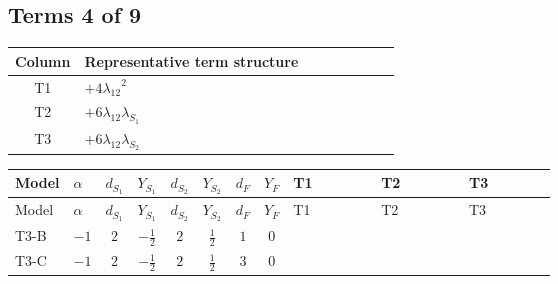 \documentclass[8pt]{article}
\begin{document}
\begin{landscape}
\subsection*{Terms 4 of 9}
\begin{center}
\begin{tabular}{@{}c >{\raggedright\arraybackslash}p{0.82\linewidth}@{}}
\toprule
Column & Representative term structure \\
\midrule
T1 & \(\displaystyle +4 {\lambda_{12}}^2\) \\
\midrule
T2 & \(\displaystyle +6 {\lambda_{12}} {\lambda_{S_1}}\) \\
\midrule
T3 & \(\displaystyle +6 {\lambda_{12}} {\lambda_{S_2}}\) \\
\midrule
\bottomrule
\end{tabular}
\end{center}
\smallskip
\tiny
\begin{longtable}{@{}llcccccc >{\raggedright\arraybackslash}p{0.21\linewidth} >{\raggedright\arraybackslash}p{0.21\linewidth} >{\raggedright\arraybackslash}p{0.21\linewidth}@{}}
\toprule
Model & $\alpha$ & $d_{S_1}$ & $Y_{S_1}$ & $d_{S_2}$ & $Y_{S_2}$ & $d_F$ & $Y_F$ & T1 & T2 & T3 \\
\midrule
\endfirsthead
\toprule
Model & $\alpha$ & $d_{S_1}$ & $Y_{S_1}$ & $d_{S_2}$ & $Y_{S_2}$ & $d_F$ & $Y_F$ & T1 & T2 & T3 \\
\midrule
\endhead
T3-B & $-1$ & $2$ & $-\frac{1}{2}$ & $2$ & $\frac{1}{2}$ & $1$ & $0$ & \scriptsize\adjustbox{max width=\linewidth}{$\begin{gathered} +4 {\lambda_{12}}^2\end{gathered}$} & \scriptsize\adjustbox{max width=\linewidth}{$\begin{gathered} +6 {\lambda_{12}} {\lambda_{S_1}}\end{gathered}$} & \scriptsize\adjustbox{max width=\linewidth}{$\begin{gathered} +6 {\lambda_{12}} {\lambda_{S_2}}\end{gathered}$} \\
\midrule
T3-C & $-1$ & $2$ & $-\frac{1}{2}$ & $2$ & $\frac{1}{2}$ & $3$ & $0$ & \scriptsize\adjustbox{max width=\linewidth}{$\begin{gathered} +4 {\lambda_{12}}^2\end{gathered}$} & \scriptsize\adjustbox{max width=\linewidth}{$\begin{gathered} +6 {\lambda_{12}} {\lambda_{S_1}}\end{gathered}$} & \scriptsize\adjustbox{max width=\linewidth}{$\begin{gathered} +6 {\lambda_{12}} {\lambda_{S_2}}\end{gathered}$} \\

\end{longtable}
\end{landscape}
\end{document}
